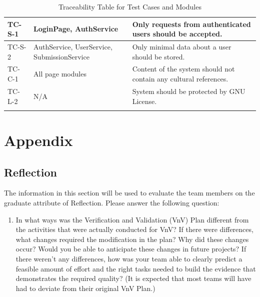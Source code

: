 \documentclass[12pt, titlepage]{article}
\begin{document}
\begin{longtable}{| p{2.5cm} | p{5cm} | p{6cm}| }
     \hline
    TC-S-1 & LoginPage, AuthService & Only requests from authenticated users should be accepted. \\
     \hline
    TC-S-2 & AuthService, UserService, SubmissionService & Only minimal data about a user should be stored.\\
     \hline
    TC-C-1 &  All page modules & Content of the system should not contain any cultural references.\\
     \hline
    TC-L-2 & N/A & System should be protected by GNU License.\\
     \hline
    \caption{Traceability Table for Test Cases and Modules}
    \label{tab:trace}
\end{longtable}





\newpage{}
\section*{Appendix}

\subsection{Reflection}
The information in this section will be used to evaluate the team members on the
graduate attribute of Reflection.  Please answer the following question:

\begin{enumerate}
  \item In what ways was the Verification and Validation (VnV) Plan different
  from the activities that were actually conducted for VnV?  If there were
  differences, what changes required the modification in the plan?  Why did
  these changes occur?  Would you be able to anticipate these changes in future
  projects?  If there weren't any differences, how was your team able to clearly
  predict a feasible amount of effort and the right tasks needed to build the
  evidence that demonstrates the required quality?  (It is expected that most
  teams will have had to deviate from their original VnV Plan.)
  
  
\end{enumerate}
\end{document}
